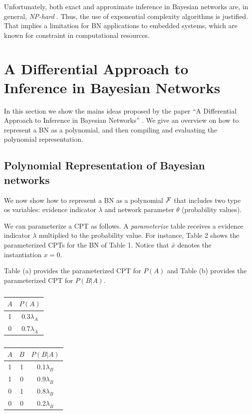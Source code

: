 \documentclass[twoside,11pt]{article}
\begin{document}
Unfortunately, both exact and approximate inference in Bayesian networks are, in general,  \emph{NP-hard} \citep{koll09}. 
Thus, the use of exponential complexity algorithms is justified.
That implies a limitation for BN applications to embedded systems, which are known for constraint in computational resources.

\section{A Differential Approach to Inference in Bayesian Networks}
\label{sec:ac}


In this section we show the mains ideas proposed by the paper ``A Differential Approach to Inference in Bayesian Networks'' \citeyearpar{darwiche00}.
We give an overview on how to  represent a BN as a polynomial, and then compiling and evaluating the polynomial representation.

\subsection{Polynomial Representation of Bayesian networks}

We now show how to represent a BN as a polynomial $\cal F$ that includes two type os variables:
evidence indicator $\lambda$ and
network parameter $\theta$ (probability values).

We can parameterize a CPT as follows.
A \emph{parameterize} table receives a evidence indicator $\lambda$ multiplied to the probability value.
For instance, Table 2 shows the parameterized CPTs for the BN of Table 1.
Notice that $\bar x$ denotes the instantiation $x = 0$.

\begin{table}[!htb]
    \caption{Table (a) provides the parameterized CPT for $P(A)$ and Table (b) provides the parameterized CPT for $P(B|A)$.}
    \begin{subtable}{.5\linewidth}
    \label{subtb:papara}
      \centering
        \caption{}
        \begin{tabular}{c|c}
            $A$ & $P(A)$ \\ \hline
            1 & 0.3$\lambda_{{A}}$ \\
            0 & 0.7$\lambda_{\bar{A}}$
        \end{tabular}
    \end{subtable}%
    \begin{subtable}{.5\linewidth}
      \centering
        \caption{}
        \begin{tabular}{cc|c}
            $A$ & $B$ & $P(B|A)$ \\ \hline
            1 & 1 & 0.1$\lambda_{{B}}$ \\
            1 & 0 & 0.9$\lambda_{\bar{B}}$ \\
            0 & 1 & 0.8$\lambda_{{B}}$ \\
            0 & 0 & 0.2$\lambda_{\bar{B}}$ \\
        \end{tabular}
    \end{subtable} 
\end{table}
\end{document}
